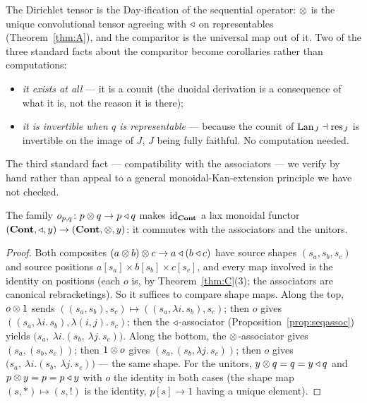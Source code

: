 \begin{Corollary}\label{cor:whatitis}
The Dirichlet tensor is the Day-ification of the sequential operator: $\mathbin{\otimes}$ is
the unique convolutional tensor agreeing with $\mathbin{\triangleleft}$ on representables
(Theorem~\ref{thm:A}), and the comparitor is the universal map out of it. Two of
the three standard facts about the comparitor become corollaries rather than
computations:
\begin{itemize}[nosep]
\item \emph{it exists at all} --- it is a counit (the duoidal derivation is a
  consequence of what it is, not the reason it is there);
\item \emph{it is invertible when $q$ is representable}
  \cite[eq.~(33)]{SpivakRef} --- because the counit of $\mathrm{Lan}_J\dashv\mathrm{res}_J$
  is invertible on the image of $J$, $J$ being fully faithful. No computation
  needed.
\end{itemize}
\end{Corollary}

The third standard fact --- compatibility with the associators --- we verify by
hand rather than appeal to a general monoidal-Kan-extension principle we have
not checked.

\begin{Proposition}\label{prop:ocoh}
The family $o_{p,q}\colon p\mathbin{\otimes} q\to p\mathbin{\triangleleft} q$ makes $\mathrm{id}_{\mathbf{Cont}}$ a lax monoidal
functor $(\mathbf{Cont},\mathbin{\triangleleft},y)\to(\mathbf{Cont},\mathbin{\otimes},y)$: it commutes with the associators and
the unitors.
\end{Proposition}

\begin{proof}
Both composites $(a\mathbin{\otimes} b)\mathbin{\otimes} c\to a\mathbin{\triangleleft}(b\mathbin{\triangleleft} c)$ have source shapes
$(s_a,s_b,s_c)$ and source positions $a[s_a]\times b[s_b]\times c[s_c]$, and
every map involved is the identity on positions (each $o$ is, by
Theorem~\ref{thm:C}(3); the associators are canonical rebracketings). So it
suffices to compare shape maps. Along the top,
$o\mathbin{\otimes} 1$ sends $((s_a,s_b),s_c)\mapsto((s_a,\lambda i.\,s_b),s_c)$; then $o$
gives $((s_a,\lambda i.\,s_b),\lambda(i,j).\,s_c)$; then the $\mathbin{\triangleleft}$-associator
(Proposition~\ref{prop:seqassoc}) yields
$\bigl(s_a,\ \lambda i.(s_b,\ \lambda j.\,s_c)\bigr)$. Along the bottom, the
$\mathbin{\otimes}$-associator gives $(s_a,(s_b,s_c))$; then $1\mathbin{\otimes} o$ gives
$(s_a,(s_b,\lambda j.\,s_c))$; then $o$ gives
$\bigl(s_a,\ \lambda i.(s_b,\ \lambda j.\,s_c)\bigr)$ --- the same shape. For the
unitors, $y\mathbin{\otimes} q=q=y\mathbin{\triangleleft} q$ and $p\mathbin{\otimes} y=p=p\mathbin{\triangleleft} y$ with $o$ the identity in
both cases (the shape map $(s,\ast)\mapsto(s,!)$ is the identity, $p[s]\to 1$
having a unique element).
\end{proof}

